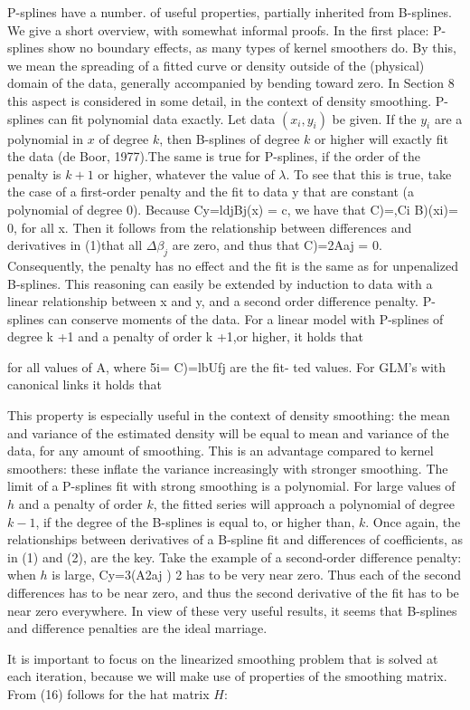 \documentclass[12pt]{article}
\newcommand*\needsparaphrased{\color{red}}
\begin{document}
{\needsparaphrased P-splines have a number. of useful properties, partially inherited from B-splines. We give a short overview, with somewhat informal proofs. In the first place: P-splines show no boundary effects, as many types of kernel smoothers do. By this, we mean the spreading of a fitted curve or density outside of the (physical) domain of the data, generally accompanied by bending toward zero. In Section 8 this aspect is considered in some detail, in the context of density smoothing. P-splines can fit polynomial data exactly. Let data $\left(x_i,y_i\right)$ be given. If the $y_i$ are a polynomial in $x$ of degree $k$, then B-splines of degree $k$ or higher will exactly fit the data (de Boor, 1977).The same is true for P-splines, if the order of the penalty is $k +1$ or higher, whatever the value of $\lambda$. To see that this is true, take the case of a first-order penalty and the fit to data y that are constant (a polynomial of degree 0). Because Cy=ldjBj(x) = c, we have that C)=,Ci B)(xi)= 0, for all x. Then it follows from the relationship between differences and derivatives in (1)that all $\Delta \beta_j$ are zero, and thus that C)=2Aaj = 0. Consequently, the penalty has no effect and the fit is the same as for unpenalized B-splines. This reasoning can easily be extended by induction to data with a linear relationship between x and y, and a second order difference penalty.
P-splines can conserve moments of the data. For a linear model with P-splines of degree k +1 and a penalty of order k +1,or higher, it holds that }

{\needsparaphrased  for all values of A, where 5i= C)=lbUfj are the fit- ted values. For GLM's with canonical links it holds that }

{\needsparaphrased This property is especially useful in the context of density smoothing: the mean and variance of the estimated density will be equal to mean and variance of the data, for any amount of smoothing. This is an advantage compared to kernel smoothers: these inflate the variance increasingly with stronger smoothing. The limit of a P-splines fit with strong smoothing is a polynomial. For large values of $h$ and a penalty of order $k$, the fitted series will approach a polynomial of degree $k-1$, if the degree of the B-splines is equal to, or higher than, $k$. Once again, the relationships between derivatives of a B-spline fit and differences of coefficients, as in (1) and (2), are the key. Take the example of a second-order difference penalty: when $h$ is large, Cy=3(A2aj ) 2 has to be very near zero. Thus each of the second differences has to be near zero, and thus the second derivative of the fit has to be near zero everywhere. In view of these very useful results, it seems that B-splines and difference penalties are the ideal marriage.

It is important to focus on the linearized smoothing problem that is solved at each iteration, because we will make use of properties of the smoothing matrix. From (16) follows for the hat matrix $H$:}
\end{document}
